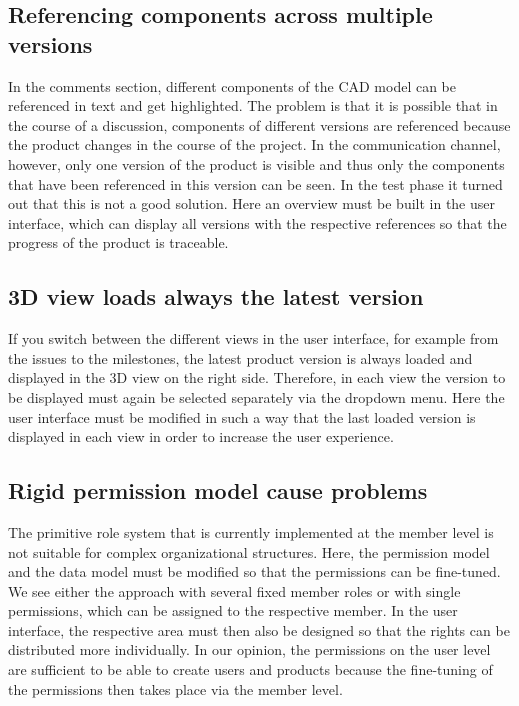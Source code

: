 \subsection*{Referencing components across multiple versions}
In the comments section, different components of the CAD model can be referenced in text and get highlighted. The problem is that it is possible that in the course of a discussion, components of different versions are referenced because the product changes in the course of the project. In the communication channel, however, only one version of the product is visible and thus only the components that have been referenced in this version can be seen. In the test phase it turned out that this is not a good solution. Here an overview must be built in the user interface, which can display all versions with the respective references so that the progress of the product is traceable.

\subsection*{3D view loads always the latest version}
If you switch between the different views in the user interface, for example from the issues to the milestones, the latest product version is always loaded and displayed in the 3D view on the right side. Therefore, in each view the version to be displayed must again be selected separately via the dropdown menu. Here the user interface must be modified in such a way that the last loaded version is displayed in each view in order to increase the user experience.

\subsection*{Rigid permission model cause problems}
The primitive role system that is currently implemented at the member level is not suitable for complex organizational structures. Here, the permission model and the data model must be modified so that the permissions can be fine-tuned. We see either the approach with several fixed member roles or with single permissions, which can be assigned to the respective member. In the user interface, the respective area must then also be designed so that the rights can be distributed more individually. In our opinion, the permissions on the user level are sufficient to be able to create users and products because the fine-tuning of the permissions then takes place via the member level.

